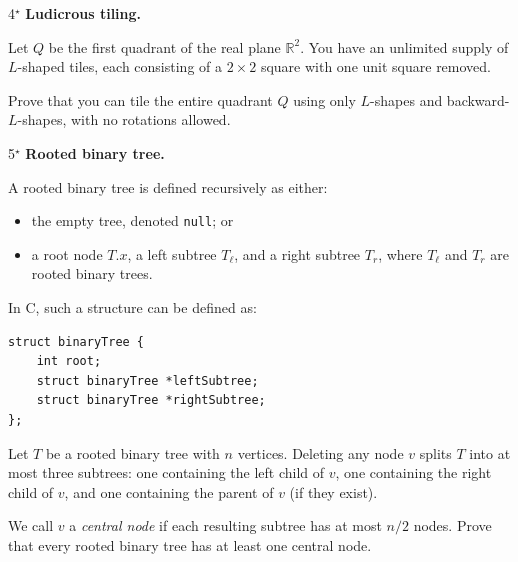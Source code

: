 \documentclass[12pt]{article}
\begin{document}
\newpage 

\begin{problem}{4$^\star$}
\textbf{Ludicrous tiling.}  

    Let $Q$ be the first quadrant of the real plane $\mathbb{R}^2$. You have an unlimited supply
    of $L$-shaped tiles, each consisting of a $2 \times 2$ square with one unit square removed.

    Prove that you can tile the entire quadrant $Q$ using only $L$-shapes and backward-$L$-shapes,
    with no rotations allowed.


\end{problem}

\begin{problem}{5$^\star$}
\textbf{Rooted binary tree.}  

    A rooted binary tree is defined recursively as either:
    \begin{itemize}
    \item the empty tree, denoted \texttt{null}; or
    \item a root node $T.x$, a left subtree $T_\ell$, and a right subtree $T_r$, where
    $T_\ell$ and $T_r$ are rooted binary trees.
    \end{itemize}

    In C, such a structure can be defined as:
    \begin{lstlisting}
struct binaryTree {
    int root;
    struct binaryTree *leftSubtree;
    struct binaryTree *rightSubtree;
};
    \end{lstlisting}

    Let $T$ be a rooted binary tree with $n$ vertices. Deleting any node $v$ splits $T$ into
    at most three subtrees: one containing the left child of $v$, one containing the right child
    of $v$, and one containing the parent of $v$ (if they exist).

    We call $v$ a \emph{central node} if each resulting subtree has at most $n/2$ nodes.
    Prove that every rooted binary tree has at least one central node.
\end{problem}
\end{document}
